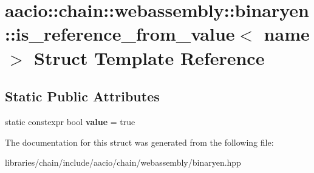 \hypertarget{structaacio_1_1chain_1_1webassembly_1_1binaryen_1_1is__reference__from__value_3_01name_01_4}{}\section{aacio\+:\+:chain\+:\+:webassembly\+:\+:binaryen\+:\+:is\+\_\+reference\+\_\+from\+\_\+value$<$ name $>$ Struct Template Reference}
\label{structaacio_1_1chain_1_1webassembly_1_1binaryen_1_1is__reference__from__value_3_01name_01_4}
\subsection*{Static Public Attributes}
\begin{DoxyCompactItemize}
\item 
\mbox{\label{structaacio_1_1chain_1_1webassembly_1_1binaryen_1_1is__reference__from__value_3_01name_01_4_aec6eeb00e62b8977fca4e23b1635d610}} 
static constexpr bool {\bfseries value} = true
\end{DoxyCompactItemize}


The documentation for this struct was generated from the following file\+:\begin{DoxyCompactItemize}
\item 
libraries/chain/include/aacio/chain/webassembly/binaryen.\+hpp\end{DoxyCompactItemize}
